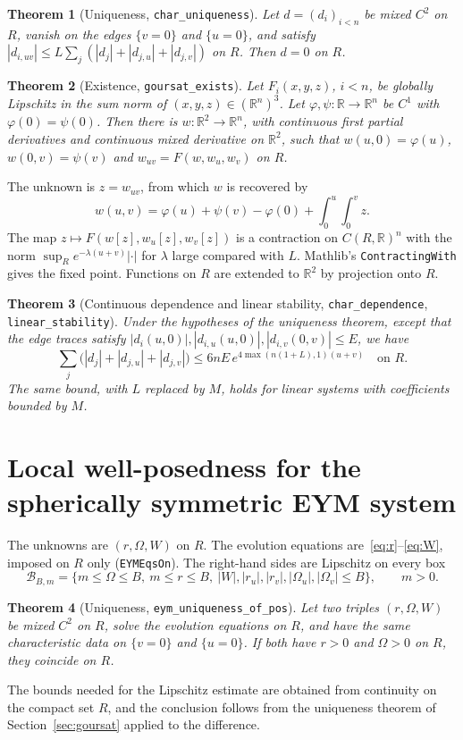 \documentclass[11pt]{amsart}
\newtheorem{theorem}{Theorem}[section]
\theoremstyle{definition}
\theoremstyle{remark}
\newcommand{\lean}[1]{\texttt{#1}}
\newcommand{\R}{\mathbb{R}}
\begin{document}
\begin{theorem}[Uniqueness, \lean{char\_uniqueness}]
Let $d=(d_i)_{i<n}$ be mixed $C^2$ on $R$, vanish on the edges $\{v=0\}$ and $\{u=0\}$, and satisfy $|d_{i,uv}|\le L\sum_j(|d_j|+|d_{j,u}|+|d_{j,v}|)$ on $R$. Then $d=0$ on $R$.
\end{theorem}

\begin{theorem}[Existence, \lean{goursat\_exists}]\label{thm:existence}
Let $F_i(x,y,z)$, $i<n$, be globally Lipschitz in the sum norm of $(x,y,z)\in(\R^n)^3$. Let $\varphi,\psi:\R\to\R^n$ be $C^1$ with $\varphi(0)=\psi(0)$. Then there is $w:\R^2\to\R^n$, with continuous first partial derivatives and continuous mixed derivative on $\R^2$, such that $w(u,0)=\varphi(u)$, $w(0,v)=\psi(v)$ and $w_{uv}=F(w,w_u,w_v)$ on $R$.
\end{theorem}
The unknown is $z=w_{uv}$, from which $w$ is recovered by
\[
w(u,v)=\varphi(u)+\psi(v)-\varphi(0)+\int_0^u\!\!\int_0^vz.
\]
The map $z\mapsto F(w[z],w_u[z],w_v[z])$ is a contraction on $C(R,\R)^n$ with the norm $\sup_Re^{-\lambda(u+v)}|\cdot|$ for $\lambda$ large compared with $L$. Mathlib's \lean{ContractingWith} gives the fixed point. Functions on $R$ are extended to $\R^2$ by projection onto $R$.

\begin{theorem}[Continuous dependence and linear stability, \lean{char\_dependence}, \lean{linear\_stability}]
Under the hypotheses of the uniqueness theorem, except that the edge traces satisfy $|d_i(u,0)|,|d_{i,u}(u,0)|,|d_{i,v}(0,v)|\le E$, we have
\[
\sum_j\big(|d_j|+|d_{j,u}|+|d_{j,v}|\big)\le6nE\,e^{4\max(n(1+L),1)(u+v)}\quad\text{on }R.
\]
The same bound, with $L$ replaced by $M$, holds for linear systems with coefficients bounded by $M$.
\end{theorem}

\section{Local well-posedness for the spherically symmetric EYM system}\label{sec:eym}

The unknowns are $(r,\Omega,W)$ on $R$. The evolution equations are~\eqref{eq:r}--\eqref{eq:W}, imposed on $R$ only (\lean{EYMEqsOn}). The right-hand sides are Lipschitz on every box
\[
\mathcal B_{B,m}=\{m\le\Omega\le B,\ m\le r\le B,\ |W|,|r_u|,|r_v|,|\Omega_u|,|\Omega_v|\le B\},\qquad m>0.
\]

\begin{theorem}[Uniqueness, \lean{eym\_uniqueness\_of\_pos}]
Let two triples $(r,\Omega,W)$ be mixed $C^2$ on $R$, solve the evolution equations on $R$, and have the same characteristic data on $\{v=0\}$ and $\{u=0\}$. If both have $r>0$ and $\Omega>0$ on $R$, they coincide on $R$.
\end{theorem}
The bounds needed for the Lipschitz estimate are obtained from continuity on the compact set $R$, and the conclusion follows from the uniqueness theorem of Section~\ref{sec:goursat} applied to the difference.
\end{document}
